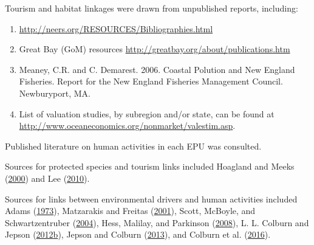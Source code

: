 \documentclass[
]{book}
\begin{document}
Tourism and habitat linkages were drawn from unpublished reports, including:

\begin{enumerate}
\def\labelenumi{\arabic{enumi}.}
\item
  \url{http://neers.org/RESOURCES/Bibliographies.html}
\item
  Great Bay (GoM) resources \url{http://greatbay.org/about/publications.htm}
\item
  Meaney, C.R. and C. Demarest. 2006. Coastal Polution and New England Fisheries. Report for the New England Fisheries Management Council. Newburyport, MA.
\item
  List of valuation studies, by subregion and/or state, can be found at \url{http://www.oceaneconomics.org/nonmarket/valestim.asp}.
\end{enumerate}

Published literature on human activities in each EPU was consulted.

Sources for protected species and tourism links included Hoagland and Meeks (\protect\hyperlink{ref-hoagland_demand_2000}{2000}) and Lee (\protect\hyperlink{ref-lee_economic_2010}{2010}).

Sources for links between environmental drivers and human activities included Adams (\protect\hyperlink{ref-adams_uncertainty_1973}{1973}), Matzarakis and Freitas (\protect\hyperlink{ref-matzarakis_proceedings_2001}{2001}), Scott, McBoyle, and Schwartzentruber (\protect\hyperlink{ref-scott_climate_2004}{2004}), Hess, Malilay, and Parkinson (\protect\hyperlink{ref-hess_climate_2008}{2008}), L. L. Colburn and Jepson (\protect\hyperlink{ref-colburn_social_2012}{2012}\protect\hyperlink{ref-colburn_social_2012}{b}), Jepson and Colburn (\protect\hyperlink{ref-jepson_development_2013}{2013}), and Colburn et al. (\protect\hyperlink{ref-colburn_indicators_2016}{2016}).
\end{document}
